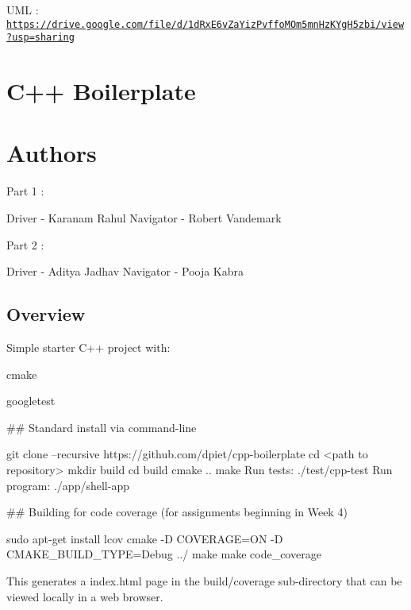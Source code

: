 U\+ML \+: \href{https://drive.google.com/file/d/1dRxE6vZaYizPvffoMOm5mnHzKYgH5zbi/view?usp=sharing}{\tt https\+://drive.\+google.\+com/file/d/1d\+Rx\+E6v\+Za\+Yiz\+Pvffo\+M\+Om5mn\+Hz\+K\+Yg\+H5zbi/view?usp=sharing}

\section*{C++ Boilerplate}

\href{https://app.travis-ci.com/karanamrahul/cpp-boilerplate}{\tt } \subsection*{\href{https://coveralls.io/github/karanamrahul/cpp-boilerplate?branch=master}{\tt } }

\section*{Authors}

Part 1 \+:

Driver -\/ Karanam Rahul Navigator -\/ Robert Vandemark

Part 2 \+:

Driver -\/ Aditya Jadhav Navigator -\/ Pooja Kabra

\subsection*{Overview}

Simple starter C++ project with\+:


\begin{DoxyItemize}
\item cmake
\item googletest
\end{DoxyItemize}

\#\# Standard install via command-\/line 
\begin{DoxyCode}
git clone --recursive https://github.com/dpiet/cpp-boilerplate
cd <path to repository>
mkdir build
cd build
cmake ..
make
Run tests: ./test/cpp-test
Run program: ./app/shell-app
\end{DoxyCode}


\#\# Building for code coverage (for assignments beginning in Week 4) 
\begin{DoxyCode}
sudo apt-get install lcov
cmake -D COVERAGE=ON -D CMAKE\_BUILD\_TYPE=Debug ../
make
make code\_coverage
\end{DoxyCode}
 This generates a index.\+html page in the build/coverage sub-\/directory that can be viewed locally in a web browser.

